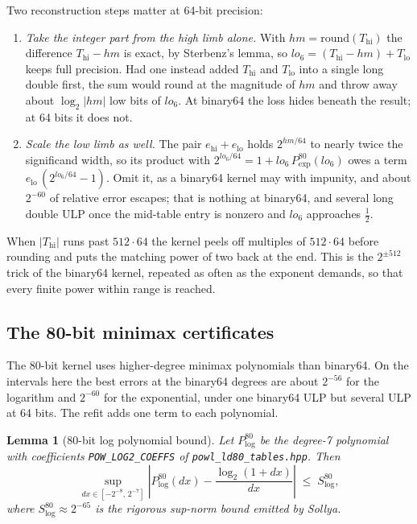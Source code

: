 \documentclass[11pt]{article}
\theoremstyle{plain}
\newtheorem{lemma}{Lemma}
\theoremstyle{remark}
\begin{document}
Two reconstruction steps matter at 64-bit precision:
\begin{enumerate}[label=(\roman*)]
  \item \emph{Take the integer part from the high limb alone.}  With
    $hm = \mathrm{round}(T_{\mathrm{hi}})$ the difference $T_{\mathrm{hi}} - hm$
    is exact, by Sterbenz's lemma, so $lo_6 = (T_{\mathrm{hi}} - hm) +
    T_{\mathrm{lo}}$ keeps full precision.  Had one instead added
    $T_{\mathrm{hi}}$ and $T_{\mathrm{lo}}$ into a single long double first, the
    sum would round at the magnitude of $hm$ and throw away about $\log_2|hm|$
    low bits of $lo_6$.  At binary64 the loss hides beneath the result; at 64
    bits it does not.
  \item \emph{Scale the low limb as well.}  The pair
    $e_{\mathrm{hi}} + e_{\mathrm{lo}}$ holds $2^{hm/64}$ to nearly twice the
    significand width, so its product with
    $2^{lo_6/64} = 1 + lo_6\,P_{\!\exp}^{80}(lo_6)$ owes a term
    $e_{\mathrm{lo}}\,(2^{lo_6/64} - 1)$.  Omit it, as a binary64 kernel may with
    impunity, and about $2^{-60}$ of relative error escapes; that is nothing at
    binary64, and several long double ULP once the mid-table entry is nonzero and
    $lo_6$ approaches $\tfrac12$.
\end{enumerate}

When $|T_{\mathrm{hi}}|$ runs past $512 \cdot 64$ the kernel peels off multiples
of $512 \cdot 64$ before rounding and puts the matching power of two back at the
end.  This is the $2^{\pm 512}$ trick of the binary64 kernel, repeated as often
as the exponent demands, so that every finite power within range is reached.

\subsection{The 80-bit minimax certificates}
\label{sec:powl-poly}

The 80-bit kernel uses higher-degree minimax polynomials than binary64.  On the
intervals here the best errors at the binary64 degrees are about $2^{-56}$ for
the logarithm and $2^{-60}$ for the exponential, under one binary64 ULP but
several ULP at 64 bits.  The refit adds one term to each polynomial.

\begin{lemma}[80-bit log polynomial bound]
\label{lem:supnorm-log-ld}
Let $P_{\!\log}^{80}$ be the degree-7 polynomial with coefficients
\texttt{POW\_LOG2\_COEFFS} of \texttt{powl\_ld80\_tables.hpp}.  Then
\[
  \sup_{dx \in [-2^{-8},\,2^{-7}]}
  \left| P_{\!\log}^{80}(dx) - \frac{\log_2(1 + dx)}{dx} \right|
  \;\le\; S_{\log}^{80},
\]
where $S_{\log}^{80} \approx 2^{-65}$ is the rigorous sup-norm bound emitted by
Sollya.
\end{lemma}
\end{document}
